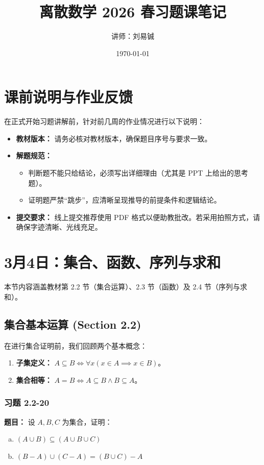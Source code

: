 \documentclass[11pt,UTF8]{article}
\title{离散数学 2026 春习题课笔记}
\author{讲师：刘易铖}
\date{\today}
\begin{document}
\maketitle

\tableofcontents


\section*{课前说明与作业反馈}

在正式开始习题讲解前，针对前几周的作业情况进行以下说明：
\begin{itemize}
    \item \textbf{教材版本：} 请务必核对教材版本，确保题目序号与要求一致。
    \item \textbf{解题规范：} 
    \begin{itemize}
        \item 判断题不能只给结论，必须写出详细理由（尤其是 PPT 上给出的思考题）。
        \item 证明题严禁“跳步”，应清晰呈现推导的前提条件和逻辑结论。
    \end{itemize}
    \item \textbf{提交要求：} 线上提交推荐使用 PDF 格式以便助教批改。若采用拍照方式，请确保字迹清晰、光线充足。
\end{itemize}

\newpage

\section{3月4日：集合、函数、序列与求和}

本节内容涵盖教材第 2.2 节（集合运算）、2.3 节（函数）及 2.4 节（序列与求和）。

\subsection{集合基本运算 (Section 2.2)}

在进行集合证明前，我们回顾两个基本概念：
\begin{enumerate}
    \item \textbf{子集定义：} $A \subseteq B \iff \forall x (x \in A \implies x \in B)$。
    \item \textbf{集合相等：} $A = B \iff A \subseteq B \land B \subseteq A$。
\end{enumerate}

\subsubsection*{习题 2.2-20}
\textbf{题目：} 设 $A, B, C$ 为集合，证明：
\begin{enumerate}[a)]
    \item $(A \cup B) \subseteq (A \cup B \cup C)$
    \item $(B - A) \cup (C - A) = (B \cup C) - A$
\end{enumerate}
\end{document}

